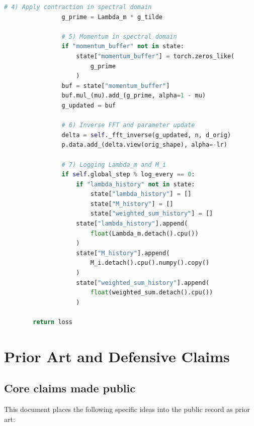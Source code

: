 \documentclass[11pt]{article}
\begin{document}
\begin{lstlisting}[style=code,language=Python]
                # 4) Apply contraction in spectral domain
                g_prime = Lambda_m * g_tilde

                # 5) Momentum in spectral domain
                if "momentum_buffer" not in state:
                    state["momentum_buffer"] = torch.zeros_like(
                        g_prime
                    )
                buf = state["momentum_buffer"]
                buf.mul_(mu).add_(g_prime, alpha=1 - mu)
                g_updated = buf

                # 6) Inverse FFT and parameter update
                delta = self._fft_inverse(g_updated, n, d_orig)
                p.data.add_(delta.view(orig_shape), alpha=-lr)

                # 7) Logging Lambda_m and M_i
                if self.global_step % log_every == 0:
                    if "lambda_history" not in state:
                        state["lambda_history"] = []
                        state["M_history"] = []
                        state["weighted_sum_history"] = []
                    state["lambda_history"].append(
                        float(Lambda_m.detach().cpu())
                    )
                    state["M_history"].append(
                        M_i.detach().cpu().numpy().copy()
                    )
                    state["weighted_sum_history"].append(
                        float(weighted_sum.detach().cpu())
                    )

        return loss
\end{lstlisting}

\section{Prior Art and Defensive Claims}

\subsection{Core claims made public}

This document places the following specific ideas into the public record as prior art:
\end{document}
